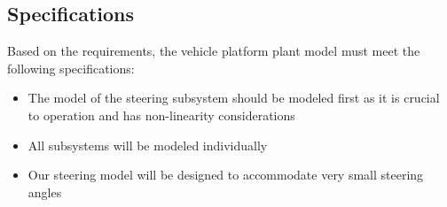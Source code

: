 \documentclass[letterpaper,12pt]{article}   %
\begin{document}

 \subsection{Specifications}
 Based on the requirements, the vehicle platform plant model must meet the following specifications:
 \begin{itemize}
    \item The model of the steering subsystem should be modeled first as it is crucial to operation and has non-linearity considerations
    \item All subsystems will be modeled individually 
    \item Our steering model will be designed to accommodate very small steering angles
 \end{itemize}




\end{document}
